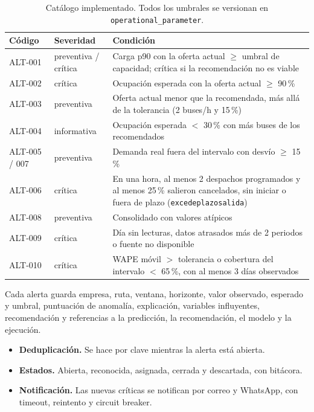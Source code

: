 \documentclass[10pt,a4paper]{article}
\newcommand{\cod}[1]{\texttt{\small #1}}
\begin{document}
\begin{table}[H]
\centering\small
\caption{Catálogo implementado. Todos los umbrales se versionan en \cod{operational\_parameter}.}
\begin{tabularx}{\textwidth}{llY}
\toprule
\textbf{Código} & \textbf{Severidad} & \textbf{Condición} \\
\midrule
ALT-001 & preventiva / crítica & Carga p90 con la oferta actual $\ge$ umbral de capacidad; crítica si la recomendación no es viable \\
ALT-002 & crítica & Ocupación esperada con la oferta actual $\ge$ 90\,\% \\
ALT-003 & preventiva & Oferta actual menor que la recomendada, más allá de la tolerancia (2 buses/h y 15\,\%) \\
ALT-004 & informativa & Ocupación esperada $<$ 30\,\% con más buses de los recomendados \\
ALT-005 / 007 & preventiva & Demanda real fuera del intervalo con desvío $\ge$ 15\,\% \\
ALT-006 & crítica & En una hora, al menos 2 despachos programados y al menos 25\,\% salieron cancelados, sin iniciar o fuera de plazo (\cod{excedeplazosalida}) \\
ALT-008 & preventiva & Consolidado con valores atípicos \\
ALT-009 & crítica & Día sin lecturas, datos atrasados más de 2 periodos o fuente no disponible \\
ALT-010 & crítica & WAPE móvil $>$ tolerancia o cobertura del intervalo $<$ 65\,\%, con al menos 3 días observados \\
\bottomrule
\end{tabularx}
\end{table}

Cada alerta guarda empresa, ruta, ventana, horizonte, valor observado, esperado y umbral, puntuación de anomalía, explicación, variables influyentes, recomendación y referencias a la predicción, la recomendación, el modelo y la ejecución.

\begin{itemize}
  \item \textbf{Deduplicación.} Se hace por clave mientras la alerta está abierta.
  \item \textbf{Estados.} Abierta, reconocida, asignada, cerrada y descartada, con bitácora.
  \item \textbf{Notificación.} Las nuevas críticas se notifican por correo y WhatsApp, con timeout, reintento y circuit breaker.
\end{itemize}
\end{document}
